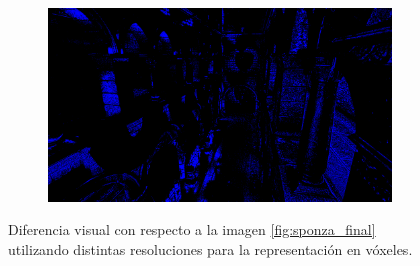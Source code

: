 \begin{figure}[H]
\begin{subfigure}[b]{.49\linewidth}
	\end{subfigure}%
	\hspace{0.01\textwidth}
	\begin{subfigure}[b]{.49\linewidth}
		\centering
		\captionsetup{justification=centering}
		\includegraphics[width=\linewidth]{media/finals/sponza_gi_64_diff.png}
	\end{subfigure}%
	\caption{Diferencia visual con respecto a la imagen \ref{fig:sponza_final} utilizando distintas resoluciones para la representación en vóxeles.}
	\label{fig:sponza_gi_resdiff}
\end{figure}

